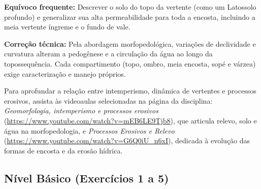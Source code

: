 \begin{boxErro}
\textbf{Equívoco frequente:} Descrever o solo do topo da vertente (como um Latossolo profundo) e generalizar sua alta permeabilidade para toda a encosta, incluindo a meia vertente íngreme e o fundo de vale.\par
\textbf{Correção técnica:} Pela abordagem morfopedológica, variações de declividade e curvatura alteram a pedogênese e a circulação da água ao longo da topossequência. Cada compartimento (topo, ombro, meia encosta, sopé e várzea) exige caracterização e manejo próprios.
\end{boxErro}

Para aprofundar a relação entre intemperismo, dinâmica de vertentes e processos erosivos, assista às videoaulas selecionadas na página da disciplina: \textit{Geomorfologia, intemperismo e processos erosivos} (\url{https://www.youtube.com/watch?v=mEB6LE9Tjb8}), que articula relevo, solo e água na morfopedologia, e \textit{Processos Erosivos e Relevo} (\url{https://www.youtube.com/watch?v=G6Q0iU_n6xI}), dedicada à evolução das formas de encosta e da erosão hídrica.


\subsection*{Nível Básico (Exercícios 1 a 5)}

